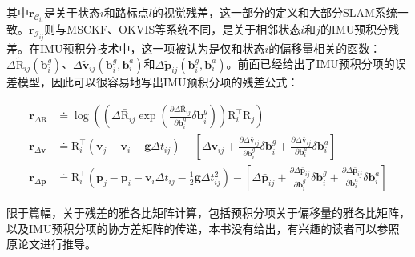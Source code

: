其中$\bm{r}_{\mathcal{C}_{il}}$是关于状态$i$和路标点$l$的视觉残差，这一部分的定义和大部分SLAM系统一致。$\bm{r}_{\mathcal{I}_{ij}}$则与MSCKF、OKVIS等系统不同，是关于相邻状态$i$和$j$的IMU预积分残差。在IMU预积分技术中，这一项被认为是仅和状态$i$的偏移量相关的函数：$\Delta\tilde{\mathrm R}_{ij}(\bm{b}^g_i)$、$\Delta\tilde{\bm v}_{ij}(\bm{b}^g_i, \bm{b}^a_i)$和$\Delta\tilde{\bm p}_{ij}(\bm{b}^g_i, \bm{b}^a_i)$。前面已经给出了IMU预积分项的误差模型，因此可以很容易地写出IMU预积分项的残差公式：

\begin{equation}
\begin{aligned}
  \bm{r}_{\Delta\mathrm{R}}
    &\doteq
      \log\left(
        \left(
          \Delta\bar{\mathrm R}_{ij}
          \exp\left(
            \frac{\partial\Delta\bar{\mathrm R}_{ij}}{\partial\bm{b}^g_i}
            \delta\bm{b}^g_i\right)
        \right) \mathrm{R}^\top_i \mathrm{R}_j
      \right) \\
  \bm{r}_{\Delta\bm{v}}
    &\doteq
      \mathrm{R}^\top_i(\bm{v}_j - \bm{v}_i - \bm{g}\Delta t_{ij}) -
      \left[
        \Delta\bar{\bm v}_{ij} +
        \tfrac{\partial\Delta\bar{\bm v}_{ij}}{\partial\bm{b}^g_i}
        \delta\bm{b}^g_i +
        \tfrac{\partial\Delta\bar{\bm v}_{ij}}{\partial\bm{b}^a_i}
        \delta\bm{b}^a_i
      \right] \\
  \bm{r}_{\Delta\bm{p}}
    &\doteq
      \mathrm{R}^\top_i(
        \bm{p}_j - \bm{p}_i -
        \bm{v}_i \Delta t_{ij} -
        \frac{1}{2}\bm{g}\Delta t^2_{ij}) -
      \left[
        \Delta\bar{\bm p}_{ij} +
        \tfrac{\partial\Delta\bar{\bm p}_{ij}}{\partial\bm{b}^g_i}
        \delta\bm{b}^g_i +
        \tfrac{\partial\Delta\bar{\bm p}_{ij}}{\partial\bm{b}^a_i}
        \delta\bm{b}^a_i \right]
\end{aligned}
\end{equation}

限于篇幅，关于残差的雅各比矩阵计算，包括预积分项关于偏移量的雅各比矩阵，以及IMU预积分项的协方差矩阵的传递，本书没有给出，有兴趣的读者可以参照原论文进行推导。
